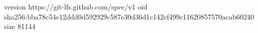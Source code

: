 version https://git-lfs.github.com/spec/v1
oid sha256:bba78c54e12ddd0d592929c587e30d36d1c142cf499c11620857570acab60240
size 81144
